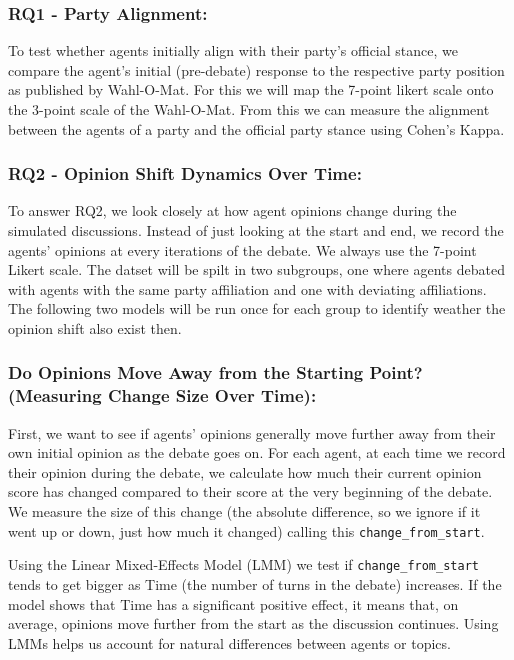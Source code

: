 \documentclass[12pt]{article}
\begin{document}
\begin{multicols}{2}
\subsubsection{RQ1 - Party Alignment:}
To test whether agents initially align with their party's official stance, we compare the agent's initial (pre-debate) response to the respective party position as published by Wahl-O-Mat. For this we will map the 7-point likert scale onto the 3-point scale of the Wahl-O-Mat. From this we can measure the alignment between the agents of a party and the official party stance using Cohen's Kappa.



\subsubsection{RQ2 - Opinion Shift Dynamics Over Time:}
\label{subsubsex:RQ2}

To answer RQ2, we look closely at how agent opinions change during the simulated discussions. Instead of just looking at the start and end, we record the agents' opinions at every iterations of the debate. We always use the 7-point Likert scale. The datset will be spilt in two subgroups, one where agents debated with agents with the same party affiliation and one with deviating affiliations. The following two models will be run once for each group to identify weather the opinion shift also exist then.


\subsubsection{Do Opinions Move Away from the Starting Point? (Measuring Change Size Over Time):}
First, we want to see if agents' opinions generally move further away from their own initial opinion as the debate goes on. For each agent, at each time we record their opinion during the debate, we calculate how much their current opinion score has changed compared to their score at the very beginning of the debate. We measure the size of this change (the absolute difference, so we ignore if it went up or down, just how much it changed) calling this \texttt{change\_from\_start}.


Using the Linear Mixed-Effects Model (LMM) we test if \texttt{change\_from\_start} tends to get bigger as Time (the number of turns in the debate) increases. If the model shows that Time has a significant positive effect, it means that, on average, opinions move further from the start as the discussion continues. Using LMMs helps us account for natural differences between agents or topics. 


\end{multicols}
\end{document}
